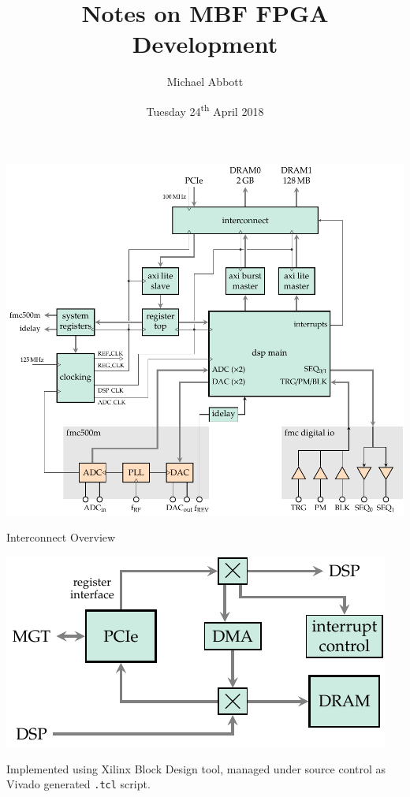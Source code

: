 \documentclass[xcolor=table]{beamer}
\title{Notes on MBF FPGA Development}
\author{Michael Abbott}
\institute{FPGA Development Working Group}
\date{Tuesday 24\textsuperscript{th} April 2018}
\begin{document}
\frame{\titlepage}


%
\begin{frame}{}

\includegraphics[width=\linewidth]{overview.pdf}

\end{frame}


%
\begin{frame}{Interconnect Overview}

\includegraphics[width=0.8\linewidth]{interconnect.pdf}

Implemented using Xilinx Block Design tool, managed under source control as
Vivado generated \texttt{.tcl} script.

\end{frame}
\end{document}
